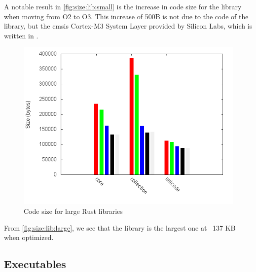 A notable result in \autoref{fig:size:lib:small} is the increase in code size for the  library when moving from O2 to O3.
This increase of 500B is not due to the {\rust} code of the  library, but the \gls{cmsis} Cortex-M3 System Layer provided by Silicon Labs, which is written in {\C}.

\begin{figure}[H]
  \begin{center}
    \includegraphics[scale=0.5]{results/plots/size/lib/large/size.png}
  \end{center}
  \caption{Code size for large Rust libraries}
  \label{fig:size:lib:large}
\end{figure}

From \autoref{fig:size:lib:large}, we see that the  library is the largest one at ~137 KB when optimized.


\subsection{Executables}

